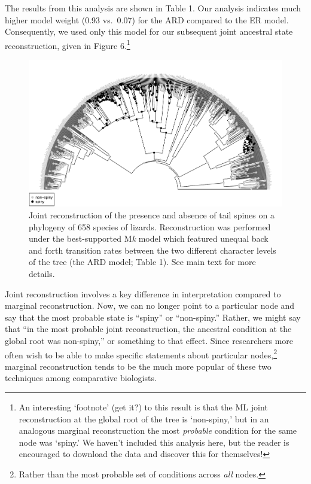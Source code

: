 \documentclass{article}
\begin{document}
The results from this analysis are shown in Table 1. Our analysis indicates much higher model weight (0.93 vs.~0.07) for the ARD compared to the ER model. Consequently, we used only this model for our subsequent joint ancestral state reconstruction, given in Figure 6.\footnote{An interesting `footnote' (get it?) to this result is that the ML joint reconstruction at the global root of the tree is `non-spiny,' but in an analogous marginal reconstruction the most \emph{probable} condition for the same node was `spiny.' We haven't included this analysis here, but the reader is encouraged to download the data and discover this for themselves!}

\begin{figure}
\includegraphics[width=1\linewidth]{Revell.AncestralReconstruction_files/figure-latex/fig6-1} \caption{Joint reconstruction of the presence and absence of tail spines on a phylogeny of 658 species of lizards. Reconstruction was performed under the best-supported M\emph{k} model which featured unequal back and forth transition rates between the two different character levels of the tree (the ARD model; Table 1). See main text for more details.}\label{fig:fig6}
\end{figure}

Joint reconstruction involves a key difference in interpretation compared to marginal reconstruction. Now, we can no longer point to a particular node and say that the most probable state is ``spiny'' or ``non-spiny.'' Rather, we might say that ``in the most probable joint reconstruction, the ancestral condition at the global root was non-spiny,'' or something to that effect. Since researchers more often wish to be able to make specific statements about particular nodes,\footnote{Rather than the most probable set of conditions across \emph{all} nodes.} marginal reconstruction tends to be the much more popular of these two techniques among comparative biologists.
\end{document}
